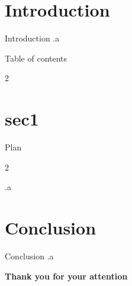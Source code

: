 \documentclass{beamer}
\title{}
\author{}
\date{\today}
\begin{document}
    { %
        \frame[noframenumbering]{\titlepage}
    } %
    
    \section*{Introduction}

    \begin{frame}{Introduction}%
        .a
    \end{frame}%

    \begin{frame}{Table of contents}%
        \begin{multicols}{2}
            \tableofcontents
        \end{multicols}
    \end{frame}%

    \section{sec1}

    {%
        \begin{frame}[noframenumbering]{Plan}
            \begin{multicols}{2}
            \end{multicols}
        \end{frame}
    }%

    \begin{frame}{}%
        .a
    \end{frame}%

    \section*{Conclusion}

    \begin{frame}{Conclusion}%
        .a
    \end{frame}%

    { %
        \begin{frame}
            \begin{center}
                {\Large{\bf Thank you for your attention}}
            \end{center}
        \end{frame}
    }%
\end{document}
